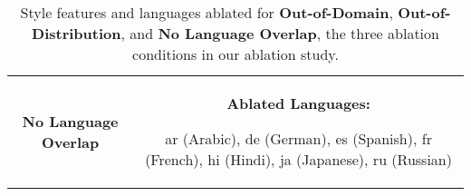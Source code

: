 {\begin{table*}[htbp]
{\begin{tabular}{|c|c|}
        \\
        \hline
        \textbf{No Language Overlap} & 
        \parbox{4cm}{{\bf Ablated Languages:} \vspace{5mm}} \parbox{12cm}{\vspace{2mm} ar (Arabic), de (German), es (Spanish), fr (French), hi (Hindi), ja (Japanese), ru (Russian) \vspace{2mm} } \\ 
        \hline
    \end{tabular}}
    \caption{Style features and languages ablated for \textbf{Out-of-Domain}, \textbf{Out-of-Distribution}, and \textbf{No Language Overlap}, the three ablation conditions in our ablation study.}
    \label{table:ablationdetailsbis}
\end{table*}

}